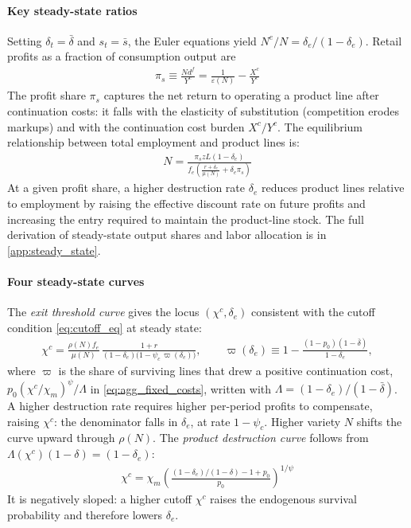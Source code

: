 \documentclass[authoryear, review, 12pt]{elsarticle}
\begin{document}
\paragraph{Key steady-state ratios}
Setting $\delta_t = \bar{\delta}$ and $s_t = \bar{s}$, the 
Euler equations yield $N^e/N = \delta_e/(1-\delta_e)$. 
Retail profits as a fraction of consumption output are
\begin{align}\label{eq:profit_share}
	\pi_s \equiv \frac{Nd^f}{Y^c} 
	= \frac{1}{\varepsilon(N)} - \frac{X^c}{Y^c}
\end{align}
The profit share $\pi_s$ captures the net return to 
operating a product line after continuation costs: it 
falls with the elasticity of substitution (competition 
erodes markups) and with the continuation cost burden 
$X^c/Y^c$. The equilibrium relationship between total 
employment and product lines is:
\begin{align}\label{eq:labor_N}
	N = \frac{\pi_s z L (1-\delta_e)}
	{f_e\left(\frac{r+\delta_e}{\mu(N)}
		+\delta_e\pi_s\right)}
\end{align}
At a given profit share, a higher destruction rate 
$\delta_e$ reduces product lines relative to employment 
by raising the effective discount rate on future profits 
and increasing the entry required to maintain the 
product-line stock. The full derivation of steady-state 
output shares and labor allocation is in 
\ref{app:steady_state}.

\paragraph{Four steady-state curves}
The \emph{exit threshold curve} gives the locus 
$(\chi^c, \delta_e)$ consistent with the cutoff 
condition \eqref{eq:cutoff_eq} at steady state:
\begin{align}\label{eq:exit_threshold_curve}
	\chi^c = \frac{\rho(N) f_e}{\mu(N)}\,
	\frac{1+r}{(1-\delta_e)\bigl(1-\psi_c\,\varpi(\delta_e)\bigr)},
	\qquad
	\varpi(\delta_e)\equiv1-\frac{(1-p_0)(1-\bar\delta)}{1-\delta_e},
\end{align}
where $\varpi$ is the share of surviving lines that drew a positive continuation cost,
$p_0(\chi^c/\chi_m)^\psi/\Lambda$ in \eqref{eq:agg_fixed_costs}, written with
$\Lambda=(1-\delta_e)/(1-\bar\delta)$. A higher destruction rate requires higher per-period
profits to compensate, raising $\chi^c$: the denominator falls in $\delta_e$, at rate
$1-\psi_c$. Higher variety $N$ shifts the curve upward through $\rho(N)$. The 
\emph{product destruction curve} follows from 
$\Lambda(\chi^c)(1-\delta) = (1-\delta_e)$:
\begin{align}\label{eq:destruction_curve}
	\chi^c = \chi_m\left(\frac{(1-\delta_e)/(1-\delta)-1+p_0}{p_0}
	\right)^{1/\psi}
\end{align}
It is negatively sloped: a higher cutoff $\chi^c$ 
raises the endogenous survival probability and 
therefore lowers $\delta_e$.
\end{document}
